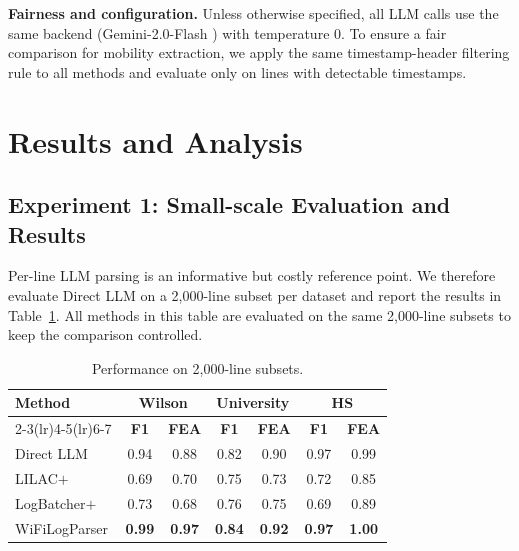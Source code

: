 \documentclass[journal]{IEEEtran}
\begin{document}
\textbf{Fairness and configuration.} Unless otherwise specified, all LLM calls use the same backend (Gemini-2.0-Flash \cite{ref38}) with temperature 0. To ensure a fair comparison for mobility extraction, we apply the same timestamp-header filtering rule to all methods and evaluate only on lines with detectable timestamps.

\section{Results and Analysis}
\label{sec:results}


\subsection{Experiment 1: Small-scale Evaluation and Results}
\label{subsec:direct_llm_subset}
Per-line LLM parsing is an informative but costly reference point. We therefore evaluate Direct LLM on a 2,000-line subset per dataset and report the results in Table~\ref{tab:subset_2000}. All methods in this table are evaluated on the same 2,000-line subsets to keep the comparison controlled.

\begin{table}[!t]
	\centering
	\caption{Performance on 2,000-line subsets.}
	\label{tab:subset_2000}
	\footnotesize
	\setlength{\tabcolsep}{4pt}
	\begin{tabular}{lcccccc}
		\toprule
		\multirow{2}{*}{\textbf{Method}}        &
		\multicolumn{2}{c}{\textbf{Wilson}}     &
		\multicolumn{2}{c}{\textbf{University}} &
		\multicolumn{2}{c}{\textbf{HS}}                                                                                                         \\
		\cmidrule(lr){2-3}\cmidrule(lr){4-5}\cmidrule(lr){6-7}
		                                        & \textbf{F1}   & \textbf{FEA}  & \textbf{F1}   & \textbf{FEA}  & \textbf{F1}   & \textbf{FEA}  \\
		\midrule
		Direct LLM                              & 0.94          & 0.88          & 0.82          & 0.90          & 0.97          & 0.99          \\
		LILAC$+$                                & 0.69          & 0.70          & 0.75          & 0.73          & 0.72          & 0.85          \\
		LogBatcher$+$                           & 0.73          & 0.68          & 0.76          & 0.75          & 0.69          & 0.89          \\
		WiFiLogParser                           & \textbf{0.99} & \textbf{0.97} & \textbf{0.84} & \textbf{0.92} & \textbf{0.97} & \textbf{1.00} \\
		\bottomrule
	\end{tabular}
\end{table}
\end{document}
